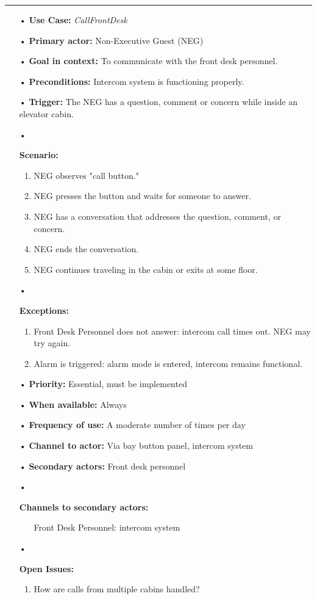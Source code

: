 \documentclass[12pt]{article}
\begin{document}
		\par\noindent\rule{\textwidth}{0.4pt}
		\begin{itemize} %
			\item[•] \textbf{Use Case:} \textit{CallFrontDesk}
			\item[•] \textbf{Primary actor:} Non-Executive Guest (NEG)
			\item[•] \textbf{Goal in context:} To communicate with the front desk personnel.
			\item[•] \textbf{Preconditions:} Intercom system is functioning properly.
			\item[•] \textbf{Trigger:} The NEG has a question, comment or concern while inside an elevator cabin.
			\item[•]{\textbf{Scenario:}
		        \begin{enumerate}
		        	\item NEG observes "call button."
		        	\item NEG presses the button and waits for someone to answer.
		        	\item NEG has a conversation that addresses the question, comment, or concern.
		        	\item NEG ends the conversation.
		        	\item NEG continues traveling in the cabin or exits at some floor.
		        \end{enumerate}}
			\item[•]{\textbf{Exceptions:} 
			    \begin{enumerate}
		        	\item Front Desk Personnel does not answer: intercom call times out. NEG may try again.
		        	\item Alarm is triggered: alarm mode is entered, intercom remains functional.
		        \end{enumerate}}
			\item[•] \textbf{Priority:} Essential, must be implemented
			\item[•] \textbf{When available:} Always
			\item[•] \textbf{Frequency of use:} A moderate number of times per day
			\item[•] \textbf{Channel to actor:} Via bay button panel, intercom system
			\item[•] \textbf{Secondary actors:} Front desk personnel		
			\item[•]{\textbf{Channels to secondary actors:} 
			    \begin{itemize}
			   		 \item[] Front Desk Personnel: intercom system
                \end{itemize}}
			\item[•]{\textbf{Open Issues:}
				\begin{enumerate}
					\item How are calls from multiple cabins handled?
				\end{enumerate}}
		\end{itemize}
		
\end{document}
